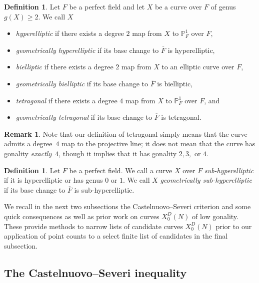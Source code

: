 \documentclass[11pt,reqno]{amsart}
\theoremstyle{definition}
\newtheorem{definition}[theorem]{Definition}
\newtheorem{remark}[theorem]{Remark}
\begin{document}
\begin{definition}
Let $F$ be a perfect field and let $X$ be a curve over $F$ of genus $g(X) \geq 2$. We call $X$
\begin{itemize}
    \item \emph{hyperelliptic} if there exists a degree $2$ map from $X$ to $\mathbb{P}^1_F$ over $F$,
    \item \emph{geometrically hyperelliptic} if its base change to $\overline{F}$ is hyperelliptic,
    \item \emph{bielliptic} if there exists a degree $2$ map from $X$ to an elliptic curve over $F$,
    \item \emph{geometrically bielliptic} if its base change to $\overline{F}$ is bielliptic,
    \item \emph{tetragonal} if there exists a degree $4$ map from $X$ to $\mathbb{P}^1_F$ over $F$, and 
    \item \emph{geometrically tetragonal} if its base change to $\overline{F}$ is tetragonal. 
\end{itemize}
\end{definition}

\begin{remark}
Note that our definition of tetragonal simply means that the curve admits a degree~$4$ map to the projective line; it does not mean that the curve has gonality \emph{exactly}~$4$, though it implies that it has gonality $2, 3,$ or $4$.
\end{remark}

\begin{definition}
Let $F$ be a perfect field. We call a curve $X$ over $F$ \emph{sub-hyperelliptic} if it is hyperelliptic or has genus $0$ or $1$. We call $X$ \emph{geometrically sub-hyperelliptic} if its base change to $\overline{F}$ is sub-hyperelliptic. 
\end{definition}

We recall in the next two subsections the Castelnuovo--Severi criterion and some quick consequences as well as prior work on curves $X_0^D(N)$ of low gonality. These provide methods to narrow lists of candidate curves $X_0^D(N)$ prior to our application of point counts to a select finite list of candidates in the final subsection. 

\subsection{The Castelnuovo--Severi inequality}\label{subsection: CS}
\end{document}

